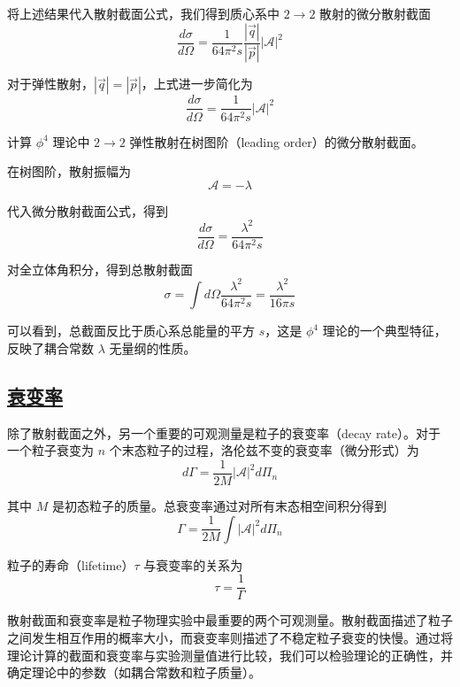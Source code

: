 将上述结果代入散射截面公式，我们得到质心系中 $2 \to 2$ 散射的微分散射截面
\begin{equation}
    \frac{d\sigma}{d\Omega} = \frac{1}{64\pi^2 s} \frac{|\vec{q}|}{|\vec{p}|} |\mathcal{A}|^2
\end{equation}

对于弹性散射，$|\vec{q}| = |\vec{p}|$，上式进一步简化为
\begin{equation}
    \frac{d\sigma}{d\Omega} = \frac{1}{64\pi^2 s} |\mathcal{A}|^2
\end{equation}

\begin{example}
    计算 $\phi^4$ 理论中 $2 \to 2$ 弹性散射在树图阶（leading order）的微分散射截面。
    \begin{solution}
        在树图阶，散射振幅为
        \begin{equation}
            \mathcal{A} = -\lambda
        \end{equation}

        代入微分散射截面公式，得到
        \begin{equation}
            \frac{d\sigma}{d\Omega} = \frac{\lambda^2}{64\pi^2 s}
        \end{equation}

        对全立体角积分，得到总散射截面
        \begin{equation}
            \sigma = \int d\Omega \frac{\lambda^2}{64\pi^2 s} = \frac{\lambda^2}{16\pi s}
        \end{equation}

        可以看到，总截面反比于质心系总能量的平方 $s$，这是 $\phi^4$ 理论的一个典型特征，反映了耦合常数 $\lambda$ 无量纲的性质。
    \end{solution}
\end{example}

\subsection{\protect\hyperlink{:}{衰变率}}

除了散射截面之外，另一个重要的可观测量是粒子的衰变率（decay rate）。对于一个粒子衰变为 $n$ 个末态粒子的过程，洛伦兹不变的衰变率（微分形式）为
\begin{equation}
    d\Gamma = \frac{1}{2M} |\mathcal{A}|^2 d\Pi_n
\end{equation}

其中 $M$ 是初态粒子的质量。总衰变率通过对所有末态相空间积分得到
\begin{equation}
    \Gamma = \frac{1}{2M} \int |\mathcal{A}|^2 d\Pi_n
\end{equation}

粒子的寿命（lifetime）$\tau$ 与衰变率的关系为
\begin{equation}
    \tau = \frac{1}{\Gamma}
\end{equation}

\begin{remark}
    散射截面和衰变率是粒子物理实验中最重要的两个可观测量。散射截面描述了粒子之间发生相互作用的概率大小，而衰变率则描述了不稳定粒子衰变的快慢。通过将理论计算的截面和衰变率与实验测量值进行比较，我们可以检验理论的正确性，并确定理论中的参数（如耦合常数和粒子质量）。
\end{remark}




